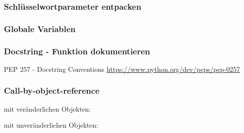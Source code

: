 \subsubsection{Schlüsselwortparameter entpacken}


\subsubsection{Globale Variablen}


\subsubsection{Docstring - Funktion dokumentieren}
PEP 257 - Docstring Conventions \url{https://www.python.org/dev/peps/pep-0257}


\subsubsection{Call-by-object-reference}
mit veränderlichen Objekten:

mit unveränderlichen Objekten:

